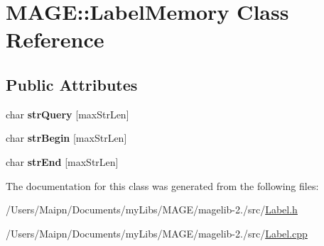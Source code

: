 \hypertarget{class_m_a_g_e_1_1_label_memory}{\section{M\-A\-G\-E\-:\-:Label\-Memory Class Reference}
\label{class_m_a_g_e_1_1_label_memory}
}
\subsection*{Public Attributes}
\begin{DoxyCompactItemize}
\item 
\hypertarget{class_m_a_g_e_1_1_label_memory_a623b0a23723b50d2bb7746b015ee8bd5}{char {\bfseries str\-Query} \mbox{[}max\-Str\-Len\mbox{]}}\label{class_m_a_g_e_1_1_label_memory_a623b0a23723b50d2bb7746b015ee8bd5}

\item 
\hypertarget{class_m_a_g_e_1_1_label_memory_a382f808581ccf99a9bb6f8b086005960}{char {\bfseries str\-Begin} \mbox{[}max\-Str\-Len\mbox{]}}\label{class_m_a_g_e_1_1_label_memory_a382f808581ccf99a9bb6f8b086005960}

\item 
\hypertarget{class_m_a_g_e_1_1_label_memory_a9e14137e9d57426d097cf3e266a2f153}{char {\bfseries str\-End} \mbox{[}max\-Str\-Len\mbox{]}}\label{class_m_a_g_e_1_1_label_memory_a9e14137e9d57426d097cf3e266a2f153}

\end{DoxyCompactItemize}


The documentation for this class was generated from the following files\-:\begin{DoxyCompactItemize}
\item 
/\-Users/\-Maipn/\-Documents/my\-Libs/\-M\-A\-G\-E/magelib-\/2./src/\hyperlink{_label_8h}{Label.\-h}\item 
/\-Users/\-Maipn/\-Documents/my\-Libs/\-M\-A\-G\-E/magelib-\/2./src/\hyperlink{_label_8cpp}{Label.\-cpp}\end{DoxyCompactItemize}
